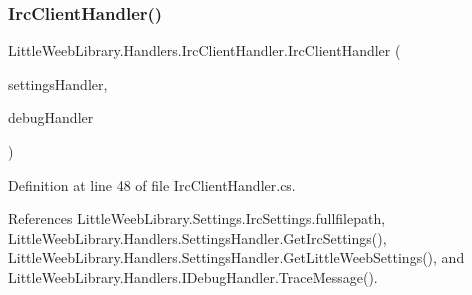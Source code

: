 \subsubsection{\texorpdfstring{Irc\+Client\+Handler()}{IrcClientHandler()}}
{\footnotesize\ttfamily Little\+Weeb\+Library.\+Handlers.\+Irc\+Client\+Handler.\+Irc\+Client\+Handler (\begin{DoxyParamCaption}\item[{\mbox{\hyperlink{interface_little_weeb_library_1_1_handlers_1_1_i_settings_handler}{I\+Settings\+Handler}}}]{settings\+Handler,  }\item[{\mbox{\hyperlink{interface_little_weeb_library_1_1_handlers_1_1_i_debug_handler}{I\+Debug\+Handler}}}]{debug\+Handler }\end{DoxyParamCaption})}



Definition at line 48 of file Irc\+Client\+Handler.\+cs.



References Little\+Weeb\+Library.\+Settings.\+Irc\+Settings.\+fullfilepath, Little\+Weeb\+Library.\+Handlers.\+Settings\+Handler.\+Get\+Irc\+Settings(), Little\+Weeb\+Library.\+Handlers.\+Settings\+Handler.\+Get\+Little\+Weeb\+Settings(), and Little\+Weeb\+Library.\+Handlers.\+I\+Debug\+Handler.\+Trace\+Message().


